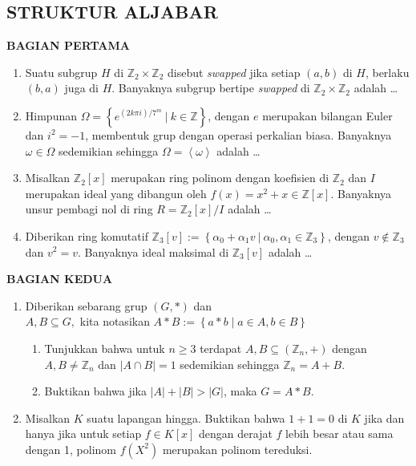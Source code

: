 \documentclass[12pt,twoside]{article}
\begin{document}
\subsection{STRUKTUR ALJABAR}
\textbf{BAGIAN PERTAMA}
\begin{enumerate}
	\item Suatu subgrup $H$ di $\mathbb{Z}_2 \times \mathbb{Z}_2$ disebut \textit{swapped} jika setiap $(a,b)$ di $H$, berlaku $(b,a)$ juga di $H$. Banyaknya subgrup bertipe \textit{swapped} di $\mathbb{Z}_2 \times \mathbb{Z}_2$ adalah \dots

	\item Himpunan $\Omega = \left\lbrace e^{(2k\pi i)/7^m} ~|~ k \in \mathbb{Z} \right\rbrace$, dengan $e$ merupakan bilangan Euler dan $i^2=-1$, membentuk grup dengan operasi perkalian biasa. Banyaknya $\omega \in \Omega$ sedemikian sehingga $\Omega = \left< \omega \right>$ adalah \dots
	\item Misalkan $\mathbb{Z}_2[x]$ merupakan ring polinom dengan koefisien di $\mathbb{Z}_2$ dan $I$ merupakan ideal yang dibangun oleh $f(x)=x^2 +x \in \mathbb{Z}[x]$. Banyaknya unsur pembagi nol di ring $R = \mathbb{Z}_2[x] / I$ adalah \dots

	\item Diberikan ring komutatif $\mathbb{Z}_3[v] := \left\lbrace \alpha_0+\alpha_1 v~|~ \alpha_0,\alpha_1 \in \mathbb{Z}_3 \right\rbrace$, dengan $v \notin \mathbb{Z}_3$ dan $v^2 = v$. Banyaknya ideal maksimal di $\mathbb{Z}_3[v]$ adalah \dots
\end{enumerate}

\newpage \textbf{BAGIAN KEDUA}
\begin{enumerate}
	\item Diberikan sebarang grup $(G,\ast)$ dan \\$A,B \subseteq G,$ kita notasikan $A \ast B := \left\lbrace a \ast b \mid a \in A, b\in B \right\rbrace$
	      \begin{enumerate}
		      \item Tunjukkan bahwa untuk $n \geq 3$ terdapat $A,B \subseteq (\mathbb{Z}_n, +)$ dengan $A,B \neq \mathbb{Z}_n$ dan $|A \cap B |=1$ sedemikian sehingga $\mathbb{Z}_n = A+B$.

		      \item Buktikan bahwa jika $|A|+|B|>|G|$, maka $G = A \ast B.$
	      \end{enumerate}

	\item Misalkan $K$ suatu lapangan hingga. Buktikan bahwa $1+1=0$ di $K$ jika dan hanya jika untuk setiap $f \in K[x]$ dengan derajat $f$ lebih besar atau sama dengan 1, polinom $f(X^2)$ merupakan polinom tereduksi.
\end{enumerate}
\end{document}
